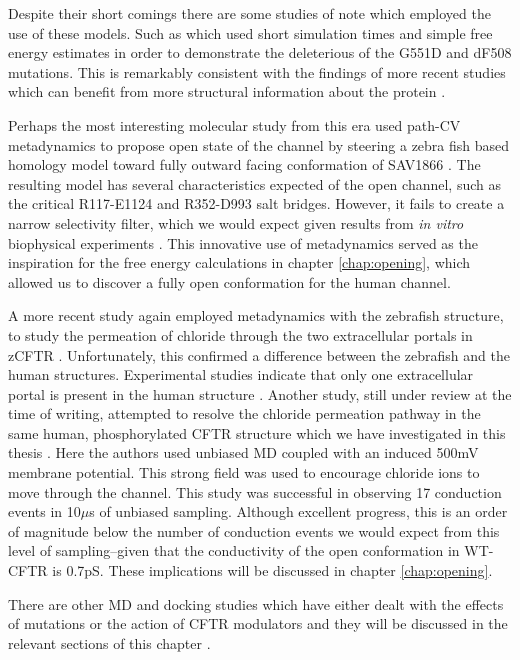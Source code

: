 Despite their short comings there are some studies of note which employed the use of these models. Such as \cite{belmonte2015} which used short simulation times and simple free energy estimates in order to demonstrate the deleterious of the G551D and dF508 mutations. This is remarkably consistent with the findings of more recent studies which can benefit from more structural information about the protein \cite{bahia2021}. 

Perhaps the most interesting molecular study from this era used path-CV metadynamics to propose open state of the channel by steering a zebra fish based homology model toward fully outward facing conformation of SAV1866 \cite{Hoffmann2018}. The resulting model has several characteristics expected of the open channel, such as the critical R117-E1124 and R352-D993 salt bridges. However, it fails to create a narrow selectivity filter, which we would expect given results from \textit{in vitro} biophysical experiments \cite{linsdell2016, linsdell2017, linsdell2021, li2018b, linsdell2020, negoda2019}. This innovative use of metadynamics served as the inspiration for the free energy calculations in chapter \ref{chap:opening}, which allowed us to discover a fully open conformation for the human channel. 

A more recent study again employed metadynamics with the zebrafish structure, to study the permeation of chloride through the two extracellular portals in zCFTR \cite{farkas2020}. Unfortunately, this confirmed a difference between the zebrafish and the human structures. Experimental studies indicate that only one extracellular portal is present in the human structure \cite{linsdell2018}. Another study, still under review at the time of writing, attempted to resolve the chloride permeation pathway in the same human, phosphorylated CFTR structure which we have investigated in this thesis \cite{zeng2021}. Here the authors used unbiased MD coupled with an induced 500mV membrane potential. This strong field was used to encourage chloride ions to move through the channel. This study was successful in observing 17 conduction events in 10$\mu$s of unbiased sampling. Although excellent progress, this is an order of magnitude below the number of conduction events we would expect from this level of sampling--given that the conductivity of the open conformation in WT-CFTR is 0.7pS\cite{kogan2003,linsdell1998}. These implications will be discussed in chapter \ref{chap:opening}.

There are other MD and docking studies which have either dealt with the effects of mutations or the action of CFTR modulators and they will be discussed in the relevant sections of this chapter \cite{billet2020, sabusap2021}. 

